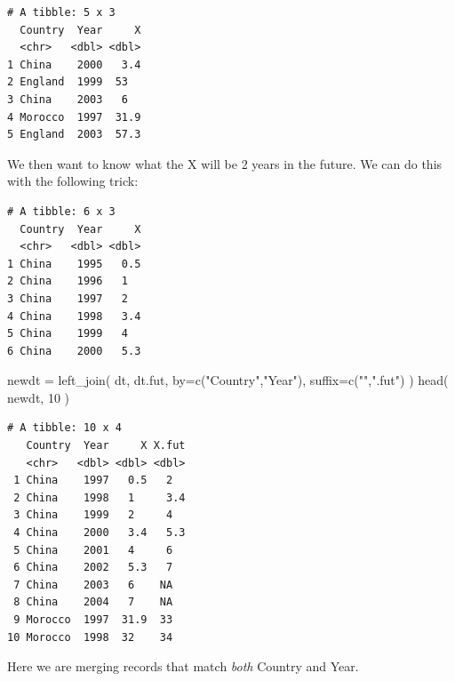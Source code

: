 \documentclass[
  letterpaper,
  DIV=11,
  numbers=noendperiod]{scrreprt}
\newenvironment{Shaded}{}{}
\newcommand{\AttributeTok}[1]{\textcolor[rgb]{0.49,0.56,0.16}{#1}}
\newcommand{\DecValTok}[1]{\textcolor[rgb]{0.25,0.63,0.44}{#1}}
\newcommand{\FunctionTok}[1]{\textcolor[rgb]{0.02,0.16,0.49}{#1}}
\newcommand{\NormalTok}[1]{#1}
\newcommand{\OtherTok}[1]{\textcolor[rgb]{0.00,0.44,0.13}{#1}}
\newcommand{\SpecialCharTok}[1]{\textcolor[rgb]{0.25,0.44,0.63}{#1}}
\newcommand{\StringTok}[1]{\textcolor[rgb]{0.25,0.44,0.63}{#1}}
\begin{document}
\begin{verbatim}
# A tibble: 5 x 3
  Country  Year     X
  <chr>   <dbl> <dbl>
1 China    2000   3.4
2 England  1999  53  
3 China    2003   6  
4 Morocco  1997  31.9
5 England  2003  57.3
\end{verbatim}

We then want to know what the X will be 2 years in the future. We can do
this with the following trick:

\begin{Shaded}
\end{Shaded}

\begin{verbatim}
# A tibble: 6 x 3
  Country  Year     X
  <chr>   <dbl> <dbl>
1 China    1995   0.5
2 China    1996   1  
3 China    1997   2  
4 China    1998   3.4
5 China    1999   4  
6 China    2000   5.3
\end{verbatim}

\begin{Shaded}
\begin{Highlighting}[]
\NormalTok{newdt }\OtherTok{=} \FunctionTok{left\_join}\NormalTok{( dt, dt.fut, }
                   \AttributeTok{by=}\FunctionTok{c}\NormalTok{(}\StringTok{"Country"}\NormalTok{,}\StringTok{"Year"}\NormalTok{), }\AttributeTok{suffix=}\FunctionTok{c}\NormalTok{(}\StringTok{""}\NormalTok{,}\StringTok{".fut"}\NormalTok{) )}
\FunctionTok{head}\NormalTok{( newdt, }\DecValTok{10}\NormalTok{ )}
\end{Highlighting}
\end{Shaded}

\begin{verbatim}
# A tibble: 10 x 4
   Country  Year     X X.fut
   <chr>   <dbl> <dbl> <dbl>
 1 China    1997   0.5   2  
 2 China    1998   1     3.4
 3 China    1999   2     4  
 4 China    2000   3.4   5.3
 5 China    2001   4     6  
 6 China    2002   5.3   7  
 7 China    2003   6    NA  
 8 China    2004   7    NA  
 9 Morocco  1997  31.9  33  
10 Morocco  1998  32    34  
\end{verbatim}

Here we are merging records that match \emph{both} Country and Year.
\end{document}
